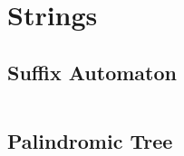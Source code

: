 \section{Strings}

\subsection{Suffix Automaton}

\inputminted{cpp}{\code/minimalist_tomato_struct.cpp}

\subsection{Palindromic Tree}

\inputminted{cpp}{\code/palindromic_tree.cpp}
